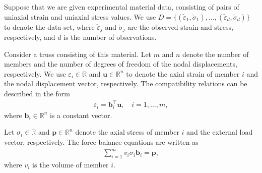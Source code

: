 \documentclass[a4paper,11pt]{scrartcl}
\theoremstyle{plain}
\theoremstyle{definition}
\theoremstyle{remark}
\renewcommand{\Re}{\ensuremath{\mathbb{R}}}
\newcommand{\bi}[1]{\ensuremath{\boldsymbol{#1}}}
\begin{document}
Suppose that we are given experimental material data, consisting of 
pairs of uniaxial strain and uniaxial stress values. 
We use 
$D = \{ (\check{\varepsilon}_{1},\check{\sigma}_{1}),
  \dots, (\check{\varepsilon}_{d},\check{\sigma}_{d}) \}$ 
to denote the data set, 
where $\check{\varepsilon}_{j}$ and $\check{\sigma}_{j}$ are the 
observed strain and stress, respectively, 
and $d$ is the number of observations. 

Consider a truss consisting of this material. 
Let $m$ and $n$ denote the number of members and the number of degrees 
of freedom of the nodal displacements, respectively. 
We use $\varepsilon_{i} \in \Re$ and $\bi{u} \in \Re^{n}$ to denote 
the axial strain of member $i$ and the nodal displacement vector, respectively. 
The compatibility relations can be described in the form 
\begin{align}
  \varepsilon_{i} = \bi{b}_{i}^{\top} \bi{u} , 
  \quad  i=1,\dots,m , 
  \label{eq:constitutive}
\end{align}
where $\bi{b}_{i} \in \Re^{n}$ is a constant vector. 

Let $\sigma_{i} \in \Re$ and $\bi{p} \in \Re^{n}$ denote the axial 
stress of member $i$ and the external load vector, respectively. 
The force-balance equations are written as 
\begin{align}
  \sum_{i=1}^{m} v_{i} \sigma_{i} \bi{b}_{i} = \bi{p} , 
  \label{eq:force-balance}
\end{align}
where $v_{i}$ is the volume of member $i$. 
\end{document}
